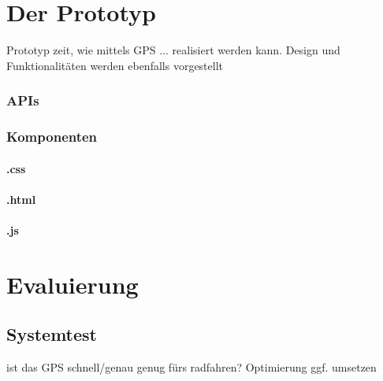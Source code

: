 \chapter{Der Prototyp}
Prototyp zeit, wie mittels GPS ... realisiert werden kann.
Design und Funktionalitäten werden ebenfalls vorgestellt
\subsection{APIs}
\subsection{Komponenten}
\subsubsection{.css}
\subsubsection{.html}
\subsubsection{.js}
%
%
\chapter{Evaluierung}
\section{Systemtest}
ist das GPS schnell/genau genug fürs radfahren?
Optimierung ggf. umsetzen
